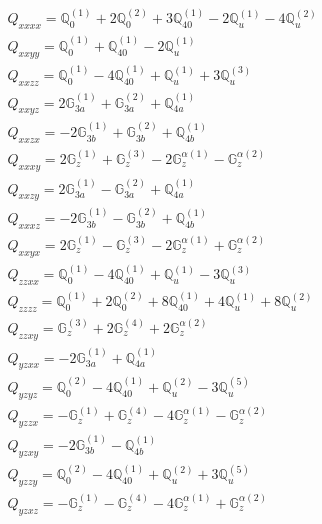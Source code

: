 \documentclass[fleqn,8pt,landscape]{jsarticle}
\begin{document}
\begin{align*}
& Q_{xxxx} = \mathbb{Q}_{0}^{(1)} + 2 \mathbb{Q}_{0}^{(2)} + 3 \mathbb{Q}_{40}^{(1)} - 2 \mathbb{Q}_{u}^{(1)} - 4 \mathbb{Q}_{u}^{(2)} \\
& Q_{xxyy} = \mathbb{Q}_{0}^{(1)} + \mathbb{Q}_{40}^{(1)} - 2 \mathbb{Q}_{u}^{(1)} \\
& Q_{xxzz} = \mathbb{Q}_{0}^{(1)} - 4 \mathbb{Q}_{40}^{(1)} + \mathbb{Q}_{u}^{(1)} + 3 \mathbb{Q}_{u}^{(3)} \\
& Q_{xxyz} = 2 \mathbb{G}_{3a}^{(1)} + \mathbb{G}_{3a}^{(2)} + \mathbb{Q}_{4a}^{(1)} \\
& Q_{xxzx} = - 2 \mathbb{G}_{3b}^{(1)} + \mathbb{G}_{3b}^{(2)} + \mathbb{Q}_{4b}^{(1)} \\
& Q_{xxxy} = 2 \mathbb{G}_{z}^{(1)} + \mathbb{G}_{z}^{(3)} - 2 \mathbb{G}_{z}^{\alpha(1)} - \mathbb{G}_{z}^{\alpha(2)} \\
& Q_{xxzy} = 2 \mathbb{G}_{3a}^{(1)} - \mathbb{G}_{3a}^{(2)} + \mathbb{Q}_{4a}^{(1)} \\
& Q_{xxxz} = - 2 \mathbb{G}_{3b}^{(1)} - \mathbb{G}_{3b}^{(2)} + \mathbb{Q}_{4b}^{(1)} \\
& Q_{xxyx} = 2 \mathbb{G}_{z}^{(1)} - \mathbb{G}_{z}^{(3)} - 2 \mathbb{G}_{z}^{\alpha(1)} + \mathbb{G}_{z}^{\alpha(2)} \\
& Q_{zzxx} = \mathbb{Q}_{0}^{(1)} - 4 \mathbb{Q}_{40}^{(1)} + \mathbb{Q}_{u}^{(1)} - 3 \mathbb{Q}_{u}^{(3)} \\
& Q_{zzzz} = \mathbb{Q}_{0}^{(1)} + 2 \mathbb{Q}_{0}^{(2)} + 8 \mathbb{Q}_{40}^{(1)} + 4 \mathbb{Q}_{u}^{(1)} + 8 \mathbb{Q}_{u}^{(2)} \\
& Q_{zzxy} = \mathbb{G}_{z}^{(3)} + 2 \mathbb{G}_{z}^{(4)} + 2 \mathbb{G}_{z}^{\alpha(2)} \\
& Q_{yzxx} = - 2 \mathbb{G}_{3a}^{(1)} + \mathbb{Q}_{4a}^{(1)} \\
& Q_{yzyz} = \mathbb{Q}_{0}^{(2)} - 4 \mathbb{Q}_{40}^{(1)} + \mathbb{Q}_{u}^{(2)} - 3 \mathbb{Q}_{u}^{(5)} \\
& Q_{yzzx} = - \mathbb{G}_{z}^{(1)} + \mathbb{G}_{z}^{(4)} - 4 \mathbb{G}_{z}^{\alpha(1)} - \mathbb{G}_{z}^{\alpha(2)} \\
& Q_{yzxy} = - 2 \mathbb{G}_{3b}^{(1)} - \mathbb{Q}_{4b}^{(1)} \\
& Q_{yzzy} = \mathbb{Q}_{0}^{(2)} - 4 \mathbb{Q}_{40}^{(1)} + \mathbb{Q}_{u}^{(2)} + 3 \mathbb{Q}_{u}^{(5)} \\
& Q_{yzxz} = - \mathbb{G}_{z}^{(1)} - \mathbb{G}_{z}^{(4)} - 4 \mathbb{G}_{z}^{\alpha(1)} + \mathbb{G}_{z}^{\alpha(2)}
\end{align*}
\end{document}
